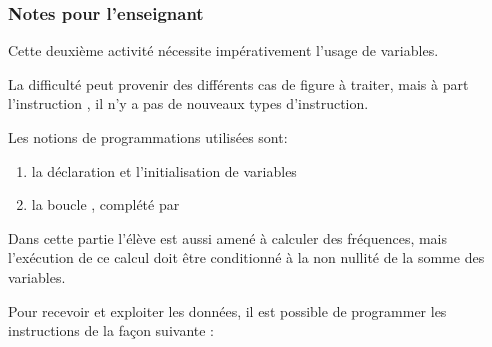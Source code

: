 \newpage
\subsubsection{Notes pour l'enseignant}

Cette deuxième activité nécessite impérativement l'usage de variables.

La difficulté peut provenir des différents cas de figure à traiter, mais à part l'instruction , il n'y a pas de nouveaux types d'instruction.

Les notions de programmations utilisées sont:
\begin{enumerate}
    \item la déclaration et l'initialisation de variables
    \item la boucle , complété par 
\end{enumerate}

Dans cette partie l'élève est aussi amené à calculer des fréquences, mais l'exécution de ce calcul doit être conditionné à la non nullité de la somme des variables.

\begin{methode}
Pour recevoir et exploiter les données, il est possible de programmer les instructions de la façon suivante : 
\end{methode}
